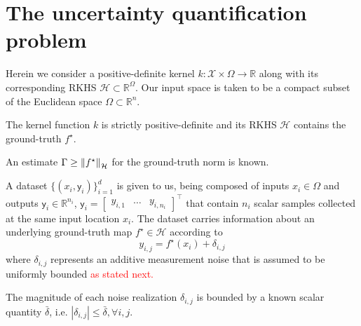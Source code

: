 
\section{The uncertainty quantification problem}


Herein we consider a positive-definite kernel $k:\mathcal{X} \times \Omega \rightarrow \mathds{R}$ along with its corresponding RKHS $\mathcal{H} \subset \mathds{R}^\Omega$. Our input space is taken to be a compact subset of the Euclidean space $\Omega \subset \mathbb{R}^n$. 

\begin{assumption}
	\label{as:kernelRkhs}
	The kernel function $k$ is strictly positive-definite and its RKHS $\mathcal{H}$ contains the ground-truth $f^\star$.
\end{assumption}

\begin{assumption}
	An estimate $\Gamma \geq \left\| f^\star \right\|_\mathcal{H}$ for the ground-truth norm is known.
\end{assumption}

A dataset $\{(x_i,\mathsf{y}_i)\}_{i=1}^d$ is given to us, being composed of inputs $x_i \in \Omega$ and outputs $\mathsf{y}_i \in \mathbb{R}^{n_i}$, $\mathsf{y}_i = \begin{bmatrix}y_{i,1} & \dots & y_{i,n_i} \end{bmatrix}^\top$ that contain $n_i$ scalar samples collected at the same input location $x_i$. The dataset carries information about an underlying ground-truth map $f^\star \in \mathcal{H}$ according to
\begin{equation}
	y_{i,j} = f^\star(x_i) + \delta_{i,j}
\end{equation}
where $\delta_{i,j}$ represents an additive measurement noise that is assumed to be uniformly bounded \textcolor{red}{as stated next.}

\begin{assumption}
	\label{as:noisebound}
	The magnitude of each noise realization $\delta_{i,j}$ is bounded by a known scalar quantity $\bar{\delta}$, i.e. $|\delta_{i,j}| \leq \bar \delta, \forall i,j$.
\end{assumption}

